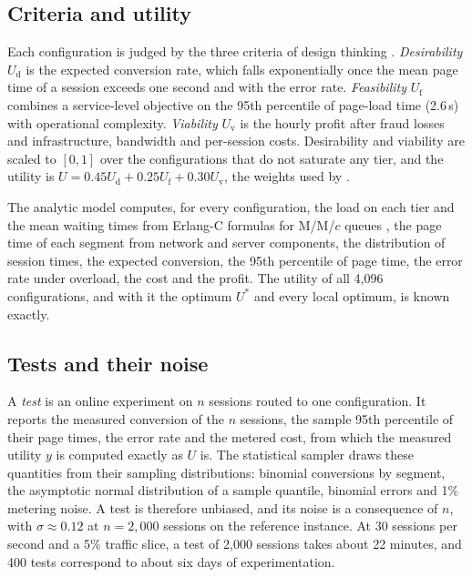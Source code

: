 \documentclass[preprint,12pt,authoryear]{elsarticle}
\theoremstyle{definition}
\begin{document}
\subsection{Criteria and utility}

Each configuration is judged by the three criteria of design thinking \citep{brown2008}. \emph{Desirability} $U_{\mathrm d}$ is the expected conversion rate, which falls exponentially once the mean page time of a session exceeds one second and with the error rate. \emph{Feasibility} $U_{\mathrm f}$ combines a service-level objective on the 95th percentile of page-load time (2.6\,s) with operational complexity. \emph{Viability} $U_{\mathrm v}$ is the hourly profit after fraud losses and infrastructure, bandwidth and per-session costs. Desirability and viability are scaled to $[0,1]$ over the configurations that do not saturate any tier, and the utility is $U=0.45U_{\mathrm d}+0.25U_{\mathrm f}+0.30U_{\mathrm v}$, the weights used by \citet{kuras2026}.

The analytic model computes, for every configuration, the load on each tier and the mean waiting times from Erlang-C formulas for M/M/$c$ queues \citep{harchol2013}, the page time of each segment from network and server components, the distribution of session times, the expected conversion, the 95th percentile of page time, the error rate under overload, the cost and the profit. The utility of all 4,096 configurations, and with it the optimum $U^*$ and every local optimum, is known exactly.

\subsection{Tests and their noise}

A \emph{test} is an online experiment on $n$ sessions routed to one configuration. It reports the measured conversion of the $n$ sessions, the sample 95th percentile of their page times, the error rate and the metered cost, from which the measured utility $y$ is computed exactly as $U$ is. The statistical sampler draws these quantities from their sampling distributions: binomial conversions by segment, the asymptotic normal distribution of a sample quantile, binomial errors and 1\% metering noise. A test is therefore unbiased, and its noise is a consequence of $n$, with $\sigma\approx0.12$ at $n=2{,}000$ sessions on the reference instance. At 30 sessions per second and a 5\% traffic slice, a test of 2,000 sessions takes about 22 minutes, and 400 tests correspond to about six days of experimentation.
\end{document}
